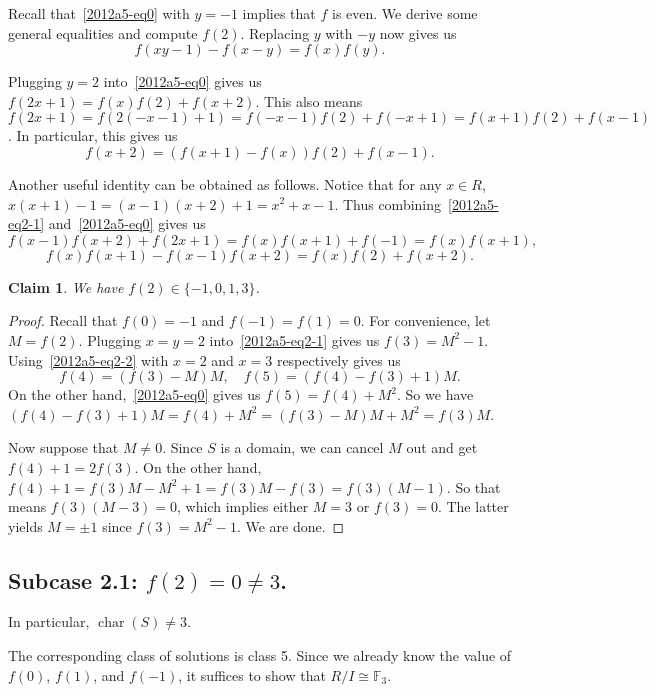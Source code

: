 \documentclass{article}
\newcommand{\F}{\mathbb{F}}
\DeclareMathOperator{\rchar}{char}
\newtheorem*{claim}{Claim}
\begin{document}
Recall that~\eqref{2012a5-eq0} with $y = -1$ implies that $f$ is even.
We derive some general equalities and compute $f(2)$.
Replacing $y$ with $-y$ now gives us
\[ f(xy - 1) - f(x - y) = f(x) f(y). \tag{2.1}\label{2012a5-eq2-1} \]

Plugging $y = 2$ into~\eqref{2012a5-eq0} gives us $f(2x + 1) = f(x) f(2) + f(x + 2)$.
This also means $f(2x + 1) = f(2(-x - 1) + 1) = f(-x - 1) f(2) + f(-x + 1) = f(x + 1) f(2) + f(x - 1)$.
In particular, this gives us
\[ f(x + 2) = (f(x + 1) - f(x)) f(2) + f(x - 1). \tag{2.2}\label{2012a5-eq2-2} \]

Another useful identity can be obtained as follows.
Notice that for any $x \in R$, $x(x + 1) - 1 = (x - 1)(x + 2) + 1 = x^2 + x - 1$.
Thus combining~\eqref{2012a5-eq2-1} and~\eqref{2012a5-eq0} gives us
\[ f(x - 1) f(x + 2) + f(2x + 1) = f(x) f(x + 1) + f(-1) = f(x) f(x + 1), \]
\[ f(x) f(x + 1) - f(x - 1) f(x + 2) = f(x) f(2) + f(x + 2). \tag{2.3}\label{2012a5-eq2-3} \]

\begin{claim}
We have $f(2) \in \{-1, 0, 1, 3\}$.
\end{claim}
\begin{proof}
Recall that $f(0) = -1$ and $f(-1) = f(1) = 0$.
For convenience, let $M = f(2)$.
Plugging $x = y = 2$ into~\eqref{2012a5-eq2-1} gives us $f(3) = M^2 - 1$.
Using~\eqref{2012a5-eq2-2} with $x = 2$ and $x = 3$ respectively gives us
\[ f(4) = (f(3) - M) M, \quad f(5) = (f(4) - f(3) + 1) M. \]
On the other hand,~\eqref{2012a5-eq0} gives us $f(5) = f(4) + M^2$.
So we have $(f(4) - f(3) + 1) M = f(4) + M^2 = (f(3) - M) M + M^2 = f(3) M$.

Now suppose that $M \neq 0$.
Since $S$ is a domain, we can cancel $M$ out and get $f(4) + 1 = 2 f(3)$.
On the other hand, $f(4) + 1 = f(3) M - M^2 + 1 = f(3) M - f(3) = f(3) (M - 1)$.
So that means $f(3) (M - 3) = 0$, which implies either $M = 3$ or $f(3) = 0$.
The latter yields $M = \pm 1$ since $f(3) = M^2 - 1$.
We are done.
\end{proof}


\subsection*{Subcase 2.1: $f(2) = 0 \neq 3$.}

In particular, $\rchar(S) \neq 3$.

The corresponding class of solutions is class 5.
Since we already know the value of $f(0)$, $f(1)$, and $f(-1)$, it suffices to show that $R/I \cong \F_3$.
\end{document}
